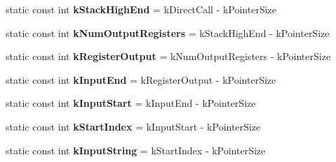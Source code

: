 \begin{DoxyCompactItemize}
\item 
static const int {\bfseries k\+Stack\+High\+End} = k\+Direct\+Call -\/ k\+Pointer\+Size\hypertarget{classv8_1_1internal_1_1_reg_exp_macro_assembler_s390_a4704fd5aaf2a3e652ef9ab4bf00ba58c}{}\label{classv8_1_1internal_1_1_reg_exp_macro_assembler_s390_a4704fd5aaf2a3e652ef9ab4bf00ba58c}

\item 
static const int {\bfseries k\+Num\+Output\+Registers} = k\+Stack\+High\+End -\/ k\+Pointer\+Size\hypertarget{classv8_1_1internal_1_1_reg_exp_macro_assembler_s390_a53558a4d4831b7558f2f97649de8beb7}{}\label{classv8_1_1internal_1_1_reg_exp_macro_assembler_s390_a53558a4d4831b7558f2f97649de8beb7}

\item 
static const int {\bfseries k\+Register\+Output} = k\+Num\+Output\+Registers -\/ k\+Pointer\+Size\hypertarget{classv8_1_1internal_1_1_reg_exp_macro_assembler_s390_add04fd87eb02e0de675ba965b77b8e7c}{}\label{classv8_1_1internal_1_1_reg_exp_macro_assembler_s390_add04fd87eb02e0de675ba965b77b8e7c}

\item 
static const int {\bfseries k\+Input\+End} = k\+Register\+Output -\/ k\+Pointer\+Size\hypertarget{classv8_1_1internal_1_1_reg_exp_macro_assembler_s390_a4be6de5b59741471cf79cceb5190a556}{}\label{classv8_1_1internal_1_1_reg_exp_macro_assembler_s390_a4be6de5b59741471cf79cceb5190a556}

\item 
static const int {\bfseries k\+Input\+Start} = k\+Input\+End -\/ k\+Pointer\+Size\hypertarget{classv8_1_1internal_1_1_reg_exp_macro_assembler_s390_ac4dbc7b01e5b5d2c0b8b0c309729f209}{}\label{classv8_1_1internal_1_1_reg_exp_macro_assembler_s390_ac4dbc7b01e5b5d2c0b8b0c309729f209}

\item 
static const int {\bfseries k\+Start\+Index} = k\+Input\+Start -\/ k\+Pointer\+Size\hypertarget{classv8_1_1internal_1_1_reg_exp_macro_assembler_s390_a6adc664b94cd9100ddd469cc75cd5750}{}\label{classv8_1_1internal_1_1_reg_exp_macro_assembler_s390_a6adc664b94cd9100ddd469cc75cd5750}

\item 
static const int {\bfseries k\+Input\+String} = k\+Start\+Index -\/ k\+Pointer\+Size\hypertarget{classv8_1_1internal_1_1_reg_exp_macro_assembler_s390_aebed06be228de992a41fe86263e7596a}{}\label{classv8_1_1internal_1_1_reg_exp_macro_assembler_s390_aebed06be228de992a41fe86263e7596a}


\end{DoxyCompactItemize}
